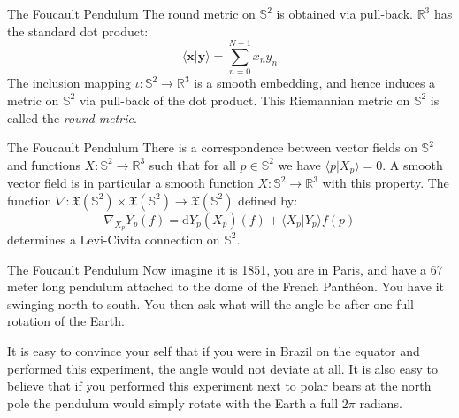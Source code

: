 \documentclass{beamer}
\begin{document}
    \begin{frame}{The Foucault Pendulum}
        The round metric on $\mathbb{S}^{2}$ is obtained via pull-back.
        $\mathbb{R}^{3}$ has the standard dot product:
        \begin{equation}
            \langle\mathbf{x}|\mathbf{y}\rangle
                =\sum_{n=0}^{N-1}{x}_{n}{y}_{n}
        \end{equation}
        The inclusion mapping $\iota:\mathbb{S}^{2}\rightarrow\mathbb{R}^{3}$
        is a smooth embedding, and hence induces a metric on $\mathbb{S}^{2}$
        via pull-back of the dot product. This Riemannian metric on
        $\mathbb{S}^{2}$ is called the \textit{round metric}.
    \end{frame}
    \begin{frame}{The Foucault Pendulum}
        There is a correspondence between vector fields on $\mathbb{S}^{2}$ and
        functions $X:\mathbb{S}^{2}\rightarrow\mathbb{R}^{3}$ such that
        for all $p\in\mathbb{S}^{2}$ we have
        $\langle{p}|X_{p}\rangle=0$. A smooth vector field is in particular a
        smooth function $X:\mathbb{S}^{2}\rightarrow\mathbb{R}^{3}$ with this
        property. The function
        $\nabla:\mathfrak{X}(\mathbb{S}^{2})\times\mathfrak{X}(\mathbb{S}^{2})%
            \rightarrow\mathfrak{X}(\mathbb{S}^{2})$ defined by:
        \begin{equation}
            \nabla_{X_{p}}Y_{p}(f)=
            \textrm{d}Y_{p}(X_{p})(f)+\langle{X}_{p}|Y_{p}\rangle{f}(p)
        \end{equation}
        determines a Levi-Civita connection on $\mathbb{S}^{2}$.
    \end{frame}
    \begin{frame}{The Foucault Pendulum}
        Now imagine it is 1851, you are in Paris, and have a 67 meter long
        pendulum attached to the dome of the French Panth\'{e}on. You have it
        swinging north-to-south. You then ask what will the angle be after one
        full rotation of the Earth.
        \par\hfill\par
        It is easy to convince your self that if you were in Brazil on the
        equator and performed this experiment, the angle would not deviate at
        all. It is also easy to believe that if you performed this experiment
        next to polar bears at the north pole the pendulum would simply rotate
        with the Earth a full $2\pi$ radians.
    \end{frame}
\end{document}
